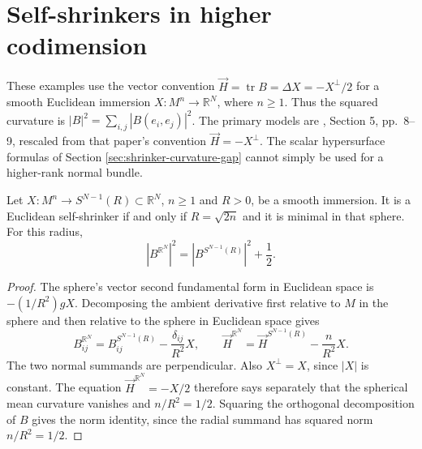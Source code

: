 \chapter{Self-shrinkers in higher codimension}\label{sec:examples-higher-codimension-shrinkers}
These examples use the vector convention $\vec H=\operatorname{tr}B=\Delta X=-X^\perp/2$ for a smooth Euclidean immersion $X:M^n\to\mathbb R^N$, where $n\geq1$. Thus the squared curvature is $|B|^2=\sum_{i,j}|B(e_i,e_j)|^2$. The primary models are \cite{CL12}, Section 5, pp.~8--9, rescaled from that paper's convention $\vec H=-X^\perp$. The scalar hypersurface formulas of Section \ref{sec:shrinker-curvature-gap} cannot simply be used for a higher-rank normal bundle.

\begin{proposition}\label{prop:spherical-minimal-shrinker-equivalence}
Let $X:M^n\to S^{N-1}(R)\subset\mathbb R^N$, $n\geq1$ and $R>0$, be a smooth immersion. It is a Euclidean self-shrinker if and only if $R=\sqrt{2n}$ and it is minimal in that sphere. For this radius,
\[
 |B^{\mathbb R^N}|^2=|B^{S^{N-1}(R)}|^2+\frac12.
\]
\end{proposition}
\begin{proof}
The sphere's vector second fundamental form in Euclidean space is $-(1/R^2)gX$. Decomposing the ambient derivative first relative to $M$ in the sphere and then relative to the sphere in Euclidean space gives
\[
 B^{\mathbb R^N}_{ij}=B^{S^{N-1}(R)}_{ij}-\frac{\delta_{ij}}{R^2}X,
 \qquad \vec H^{\mathbb R^N}=\vec H^{S^{N-1}(R)}-\frac n{R^2}X.
\]
The two normal summands are perpendicular. Also $X^\perp=X$, since $|X|$ is constant. The equation $\vec H^{\mathbb R^N}=-X/2$ therefore says separately that the spherical mean curvature vanishes and $n/R^2=1/2$. Squaring the orthogonal decomposition of $B$ gives the norm identity, since the radial summand has squared norm $n/R^2=1/2$.
\end{proof}

